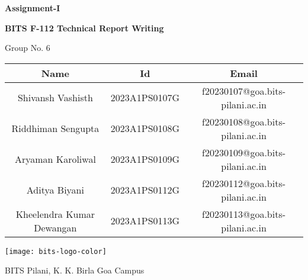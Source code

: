 \begin{titlepage}

	\begin{center}

		\vspace*{1cm}
		\Huge
		\textbf{Assignment-I}

		\vspace{0.5cm}

		\LARGE
		\textbf{BITS F-112 Technical Report Writing}

		\vspace{0.8cm}

		\Large	
		Group No. 6

		\vspace{0.6cm}

		\normalsize
		\begingroup
		\setlength{\tabcolsep}{10pt}
		\renewcommand{\arraystretch}{1.8}
		\begin{tabular} { || c | c | c || }
			\hline
			\textbf{Name} & \textbf{Id} & \textbf{Email} \\ [0.5ex]
			\hline \hline

			\hline  
			Shivansh Vashisth & 2023A1PS0107G & f20230107@goa.bits-pilani.ac.in \\  
			Riddhiman Sengupta & 2023A1PS0108G & f20230108@goa.bits-pilani.ac.in \\
			Aryaman Karoliwal & 2023A1PS0109G & f20230109@goa.bits-pilani.ac.in \\
			Aditya Biyani & 2023A1PS0112G & f20230112@goa.bits-pilani.ac.in \\
			Kheelendra Kumar Dewangan & 2023A1PS0113G & f20230113@goa.bits-pilani.ac.in \\
			[1ex]
			\hline
		\end{tabular}
		\endgroup
		

		\vfill

		\texttt{[image: bits-logo-color]}

		\Large
		BITS Pilani, K. K. Birla Goa Campus \\ 
	\end{center}

\end{titlepage}


